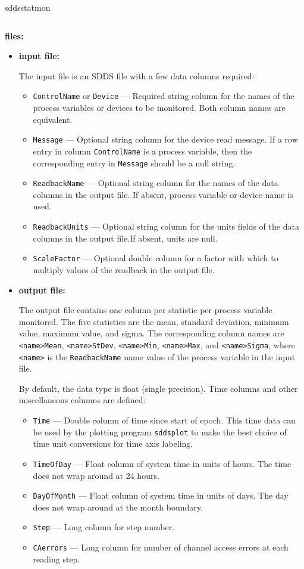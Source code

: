 \begin{sddsprog}{sddsstatmon}
\begin{verbatim}
\end{verbatim}
\item \textbf{files:}
\begin{itemize}
  \item \textbf{input file:}\par
The input file is an SDDS file with a few data columns required:
  \begin{itemize}
    \item {\tt ControlName} or {\tt Device} --- Required string column for the names of the process variables
                or devices to be monitored. Both column names are equivalent.
    \item {\tt Message} --- Optional string column for the device read message. If a row entry in
                column {\tt ControlName} is a process variable, then the corresponding entry
                in {\tt Message} should be a null string.
    \item {\tt ReadbackName} --- Optional string column for the names of the data columns in the
                output file. If absent, process variable or device name is used.
    \item {\tt ReadbackUnits} --- Optional string column for the units fields of the data columns in the
                output file.If absent, units are null.
    \item {\tt ScaleFactor} --- Optional double column for a factor with which to multiply
                values of the readback in the output file.
  \end{itemize}

  \item \textbf{output file:}\par
The output file contains one column per statistic per process variable monitored.
The five statistics are the mean, standard deviation, minimum value,
maximum value, and sigma. The corresponding column names are {\tt <name>Mean}, {\tt <name>StDev},
{\tt <name>Min}, {\tt <name>Max}, and {\tt <name>Sigma}, where {\tt <name>}
is the {\tt ReadbackName} name value of the process variable in the input file.

By default, the data type is float (single precision).
Time columns and other miscellaneous columns are defined:
  \begin{itemize}
    \item {\tt Time} --- Double column of time since start of epoch. This time data can be used by
        the plotting program {\verb+sddsplot+} to make the best choice of time unit conversions
        for time axis labeling.
    \item {\tt TimeOfDay} --- Float column of system time in units of hours.
        The time does not wrap around at 24 hours.
    \item {\tt DayOfMonth} --- Float column of system time in units of days.
        The day does not wrap around at the month boundary.
    \item {\tt Step} --- Long column for step number.
    \item {\tt CAerrors} --- Long column for number of channel access errors at each reading step.
  \end{itemize}


\end{itemize}
\end{sddsprog}
